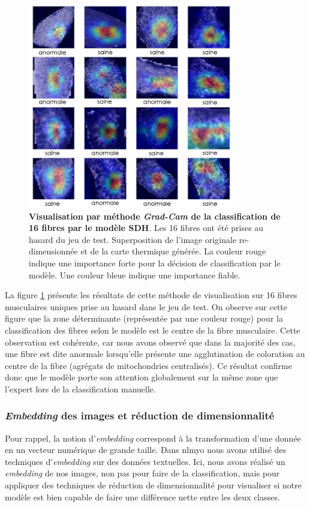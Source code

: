 \begin{figure}[!ht]
 \centering
 \includegraphics[width=0.8\textwidth]{figures/sdh_gradcam.png}
 \caption[Visualisation par méthode \textit{Grad-Cam} du modèle SDH]{\textbf{Visualisation par méthode \textit{Grad-Cam} de la classification de 16 fibres par le modèle SDH}. Les 16 fibres ont été prises au hasard du jeu de test. Superposition de l'image originale re-dimensionnée et de la carte thermique générée. La couleur rouge indique une importance forte pour la décision de classification par le modèle. Une couleur bleue indique une importance fiable.}
 \label{fig:gradcam_sdh}
\end{figure}
La figure \ref{fig:gradcam_sdh} présente les résultats de cette méthode de visualisation sur 16 fibres musculaires uniques prise au hasard dans le jeu de test. On observe sur cette figure que la zone déterminante (représentée par une couleur rouge) pour la classification des fibres selon le modèle est le centre de la fibre musculaire. Cette observation est cohérente, car nous avons observé que dans la majorité des cas, une fibre est dite anormale lorsqu'elle présente une agglutination de coloration au centre de la fibre (agrégats de mitochondries centralisés). Ce résultat confirme donc que le modèle porte son attention globalement sur la même zone que l'expert lors de la classification manuelle. 

\subsubsection{\textit{Embedding} des images et réduction de dimensionnalité} 
Pour rappel, la notion d'\textit{embedding} correspond à la transformation d'une donnée en un vecteur numérique de grande taille. Dans \gls{nlmyo} nous avons utilisé des techniques d'\textit{embedding} sur des données textuelles. Ici, nous avons réalisé un \textit{embedding} de nos images, non pas pour faire de la classification, mais pour appliquer des techniques de réduction de dimensionnalité pour visualiser si notre modèle est bien capable de faire une différence nette entre les deux classes.

